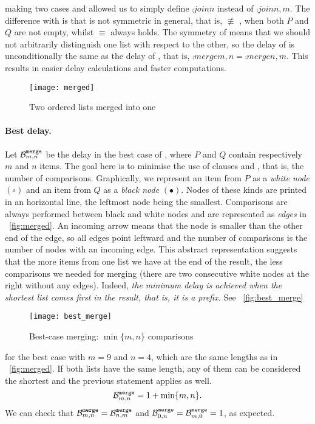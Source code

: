 making two cases and allowed us to simply define \(\comp{join}{n}\)
instead of \(\comp{join}{n,m}\). The difference with 
is that  is not symmetric in general, that is,
 \(\not\equiv\)
, when both \(P\) and \(Q\) are not empty,
whilst  \(\equiv\)
 always holds. The symmetry of
 means that we should not arbitrarily distinguish one
list with respect to the other, so the delay of
 is unconditionally the same as the delay
of , that is, \(\comp{merge}{m,n} =
\comp{merge}{n,m}\). This results in easier delay calculations and
faster computations.

\begin{figure}[H]
\centering
\texttt{[image: merged]}
\caption{Two ordered lists merged into one\label{fig:merged}}
\end{figure}


\paragraph{Best delay.}

Let \(\best{merge}{m,n}\) be the delay in the best case of
, where \(P\) and \(Q\) contain
respectively \(m\) and \(n\) items. The goal here is to minimise the
use of clauses \clause{\gamma} and \clause{\delta}, that is, the
number of comparisons. Graphically, we represent an item from \(P\) as
a \emph{white node} \((\circ)\) and an item from \(Q\) as a
\emph{black node} \((\bullet)\). Nodes of these kinds are printed in
an horizontal line, the leftmost node being the smallest. Comparisons
are always performed between black and white nodes and are represented
as \emph{edges} in \fig~\vref{fig:merged}. An incoming arrow means
that the node is smaller than the other end of the edge, so all edges
point leftward and the number of comparisons is the number of nodes
with an incoming edge. This abstract representation suggests that the
more items from one list we have at the end of the result, the less
comparisons we needed for merging (there are two consecutive white
nodes at the right without any edges). Indeed, \emph{the minimum delay
  is achieved when the shortest list comes first in the result, that is,
  it is a \emph{prefix.}} See \fig~\vref{fig:best_merge}
\begin{figure}[!b]
\centering
\texttt{[image: best\_merge]}
\caption{Best\hyp{}case merging: \(\min\{m,n\}\)
  comparisons\label{fig:best_merge}}
\end{figure}
for the best case with \(m=9\) and \(n=4\), which are the same lengths
as in \fig~\vref{fig:merged}.  If both lists have the same length, any
of them can be considered the shortest and the previous statement
applies as well.\label{merge:best_case}
\begin{equation}
\best{merge}{m,n} = 1 + \min\{m,n\}.\label{eq:best_merge}
\end{equation}
We can check that \(\best{merge}{m,n} = \best{merge}{n,m}\) and
\(\best{merge}{0,n} = \best{merge}{m,0} = 1\), as
expected.

